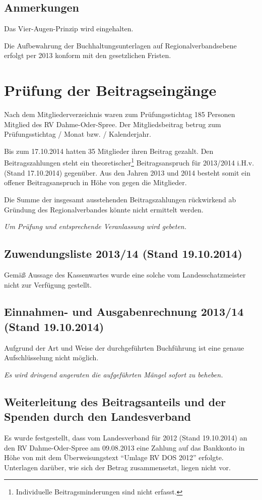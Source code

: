 \documentclass[%
	titlepage,oneside,12pt,headlines=1.5,numbers=noenddot, chapterprefix=false,parskip=full-,DIV=14,pagesize]{scrreprt}
\begin{document}
\subsection{Anmerkungen}
Das Vier-Augen-Prinzip wird eingehalten.

Die Aufbewahrung der Buchhaltungsunterlagen auf Regionalverbandsebene erfolgt per 2013 konform mit den gesetzlichen Fristen.

\section{Prüfung der Beitragseingänge}
Nach dem Mitgliederverzeichnis waren zum Prüfungsstichtag 185 Personen Mitglied des RV Dahme-Oder-Spree. Der Mitgliedsbeitrag betrug zum Prüfungsstichtag  / Monat bzw.  / Kalenderjahr.

Bis zum 17.10.2014 hatten 35 Mitglieder ihren Beitrag gezahlt. Den Beitragszahlungen steht ein theoretischer\footnote{Individuelle Beitragsminderungen sind nicht erfasst.} Beitragsanspruch für 2013/2014 i.H.v.  (Stand 17.10.2014) gegenüber. Aus den Jahren 2013 und 2014 besteht somit ein offener Beitragsanspruch in Höhe von  gegen die Mitglieder. 

Die Summe der insgesamt ausstehenden Beitragszahlungen rückwirkend ab Gründung des Regionalverbandes könnte nicht ermittelt werden.

\textit{Um Prüfung und entsprechende Veranlassung wird gebeten.}

\subsection{Zuwendungsliste 2013/14 (Stand 19.10.2014)}
Gemäß Aussage des Kassenwartes wurde eine solche vom Landesschatzmeister nicht zur Verfügung gestellt.

\subsection{Einnahmen- und Ausgabenrechnung 2013/14 (Stand 19.10.2014)}
Aufgrund der Art und Weise der durchgeführten Buchführung ist eine genaue Aufschlüsselung nicht möglich.

\textit{Es wird dringend angeraten die aufgeführten Mängel sofort zu beheben.}


\subsection{Weiterleitung des Beitragsanteils und der Spenden durch den Landesverband}
Es wurde festgestellt, dass vom Landesverband für 2012 (Stand 19.10.2014) an den RV Dahme-Oder-Spree am 09.08.2013 eine Zahlung auf das Bankkonto in Höhe von  mit dem Überweisungstext \enquote{Umlage RV DOS 2012} erfolgte. Unterlagen darüber, wie sich der Betrag zusammensetzt, liegen nicht vor.
\end{document}

